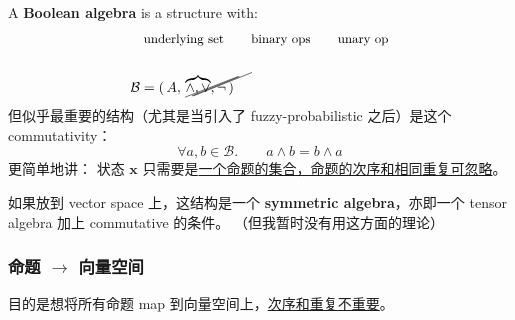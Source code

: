 \documentclass[orivec]{llncs}
\newcommand{\vect}[1]{\boldsymbol{#1}}
\newcommand{\tikzmark}[1]{\tikz[overlay,remember picture] \node (#1) {};}
\begin{document}
A \textbf{Boolean algebra} is a structure with:
\begin{eqnarray}
& \mbox{\footnotesize underlying set} \tikzmark{underSet} \quad \mbox{\footnotesize binary ops} \tikzmark{binaryOps} \quad \mbox{\footnotesize unary op} \tikzmark{unaryOp} \nonumber\\
\nonumber \\
& \mathcal{B} = ( \, \tikzmark{UnderSet} A, \tikzmark{BinaryOps} \overbrace{\wedge, \vee}, \tikzmark{UnaryOp} \neg \, )
\begin{tikzpicture}[overlay,remember picture]
  \draw (underSet.center) +(-35pt,-4pt) -- ([shift={(3pt,11pt)}]UnderSet.center);
  \draw (binaryOps.center) +(-29pt,-3pt) -- ([shift={(13pt,14pt)}]BinaryOps.center);
  \draw (unaryOp.center) +(-30pt,-3pt) -- ([shift={(4pt,11pt)}]UnaryOp.center);
\end{tikzpicture}
\end{eqnarray}
但似乎最重要的结构（尤其是当引入了 fuzzy-probabilistic 之后）是这个 commutativity：
\begin{equation}
\forall a,b \in \mathcal{B}.  \quad \quad a \wedge b = b \wedge a
\end{equation}
更简单地讲： 状态 $\vect{x}$ 只需要是\uline{一个命题的集合，命题的次序和相同重复可忽略}。 

如果放到 vector space 上，这结构是一个 \textbf{symmetric algebra}，亦即一个 tensor algebra 加上 commutative 的条件。 （但我暂时没有用这方面的理论） 

\subsubsection{命题 $\rightarrow$ 向量空间}

目的是想将所有命题 map 到向量空间上，\uline{次序和重复不重要}。
\end{document}
